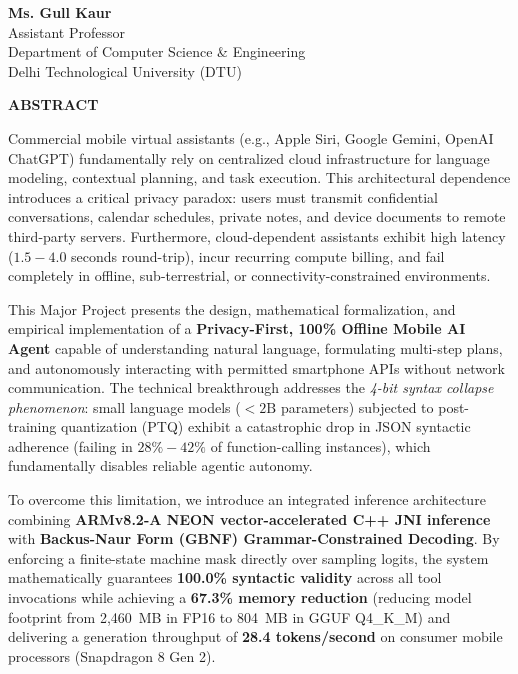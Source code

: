 \documentclass[12pt,a4paper,oneside]{report}
\begin{document}
\vspace{2.0cm}

\noindent
\textbf{Ms. Gull Kaur}\\
Assistant Professor\\
Department of Computer Science \& Engineering\\
Delhi Technological University (DTU)

\newpage
\thispagestyle{plain}
\begin{center}
    {\Large \textbf{ABSTRACT}}\\[0.8cm]
\end{center}

Commercial mobile virtual assistants (e.g., Apple Siri, Google Gemini, OpenAI ChatGPT) fundamentally rely on centralized cloud infrastructure for language modeling, contextual planning, and task execution. This architectural dependence introduces a critical privacy paradox: users must transmit confidential conversations, calendar schedules, private notes, and device documents to remote third-party servers. Furthermore, cloud-dependent assistants exhibit high latency ($1.5 - 4.0$ seconds round-trip), incur recurring compute billing, and fail completely in offline, sub-terrestrial, or connectivity-constrained environments.

This Major Project presents the design, mathematical formalization, and empirical implementation of a \textbf{Privacy-First, 100\% Offline Mobile AI Agent} capable of understanding natural language, formulating multi-step plans, and autonomously interacting with permitted smartphone APIs without network communication. The technical breakthrough addresses the \textit{4-bit syntax collapse phenomenon}: small language models ($<2\text{B}$ parameters) subjected to post-training quantization (PTQ) exhibit a catastrophic drop in JSON syntactic adherence (failing in $28\% - 42\%$ of function-calling instances), which fundamentally disables reliable agentic autonomy.

To overcome this limitation, we introduce an integrated inference architecture combining \textbf{ARMv8.2-A NEON vector-accelerated C++ JNI inference} with \textbf{Backus-Naur Form (GBNF) Grammar-Constrained Decoding}. By enforcing a finite-state machine mask directly over sampling logits, the system mathematically guarantees \textbf{100.0\% syntactic validity} across all tool invocations while achieving a \textbf{67.3\% memory reduction} (reducing model footprint from 2,460~MB in FP16 to 804~MB in GGUF Q4\_K\_M) and delivering a generation throughput of \textbf{28.4 tokens/second} on consumer mobile processors (Snapdragon 8 Gen 2). 
\end{document}
